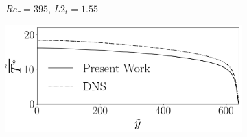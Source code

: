 \documentclass[10pt]{article} %
\begin{document}
\begin{figure}[h!]
\begin{subfigure}[t]{0.49\textwidth}
		\caption{$Re_\tau = 395$, $L2_t = 1.55$}
		\end{subfigure}
		\begin{subfigure}[t]{0.49\textwidth}
		\centering
		\includegraphics[angle=0, scale=0.24]{fotos_formatacao_final/Temperature_640_071_classico}

\end{subfigure}
\end{figure}
\end{document}
